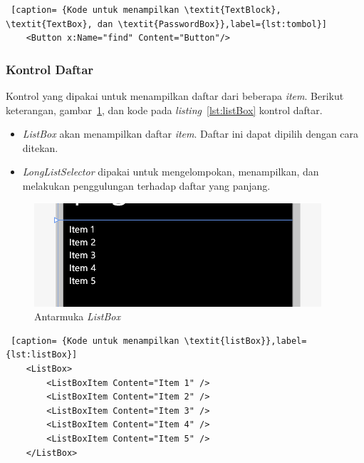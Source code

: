 \begin{lstlisting} [caption= {Kode untuk menampilkan \textit{TextBlock}, \textit{TextBox}, dan \textit{PasswordBox}},label={lst:tombol}]
	<Button x:Name="find" Content="Button"/>
\end{lstlisting}

\subsubsection{Kontrol Daftar}
\label{subsubsec:Kontrol Daftar}
\hspace{0.5cm} Kontrol yang dipakai untuk menampilkan daftar dari beberapa \textit{item}. Berikut keterangan, gambar~\ref{fig:antarmukaListBox}, dan kode pada \textit{listing}~\ref{lst:listBox} kontrol daftar. 

\begin{itemize}
	\item \textit{ListBox} akan menampilkan daftar \textit{item}. Daftar ini dapat dipilih dengan cara ditekan.
	\item \textit{LongListSelector} dipakai untuk mengelompokan, menampilkan, dan melakukan penggulungan terhadap daftar yang panjang.
\end{itemize}

\newpage

\begin{figure}[h]
	\centering
		\includegraphics[scale=0.4]{Gambar/kontrol/listBox.PNG}
	\caption{Antarmuka \textit{ListBox}}
	\label{fig:antarmukaListBox}
\end{figure}

\begin{lstlisting} [caption= {Kode untuk menampilkan \textit{listBox}},label={lst:listBox}]
	<ListBox>
		<ListBoxItem Content="Item 1" />
		<ListBoxItem Content="Item 2" />
		<ListBoxItem Content="Item 3" />
		<ListBoxItem Content="Item 4" />
		<ListBoxItem Content="Item 5" />
	</ListBox>
\end{lstlisting}

